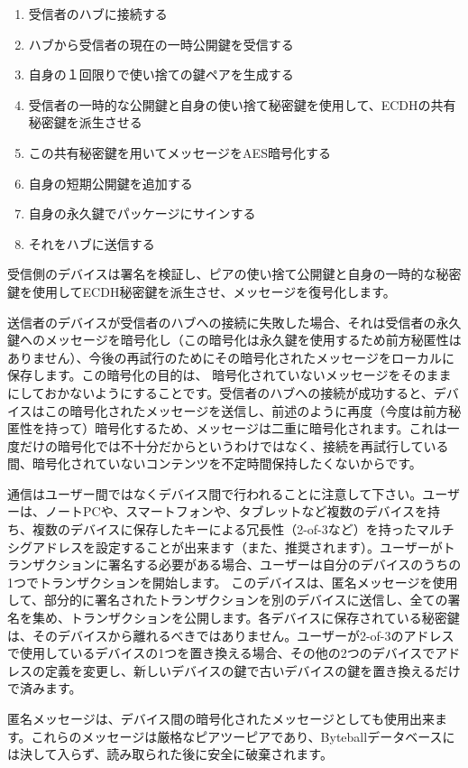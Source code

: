 \documentclass[a4paper, dvipdfmx]{jsarticle}
\begin{document}
\begin{enumerate}
    \item 受信者のハブに接続する
    \item ハブから受信者の現在の一時公開鍵を受信する
    \item 自身の１回限りで使い捨ての鍵ペアを生成する
    \item 受信者の一時的な公開鍵と自身の使い捨て秘密鍵を使用して、ECDHの共有秘密鍵を派生させる
    \item この共有秘密鍵を用いてメッセージをAES暗号化する
    \item 自身の短期公開鍵を追加する
    \item 自身の永久鍵でパッケージにサインする
    \item それをハブに送信する
\end{enumerate}

受信側のデバイスは署名を検証し、ピアの使い捨て公開鍵と自身の一時的な秘密鍵を使用してECDH秘密鍵を派生させ、メッセージを復号化します。

送信者のデバイスが受信者のハブへの接続に失敗した場合、それは受信者の永久鍵へのメッセージを暗号化し（この暗号化は永久鍵を使用するため前方秘匿性はありません）、今後の再試行のためにその暗号化されたメッセージをローカルに保存します。この暗号化の目的は、 暗号化されていないメッセージをそのままにしておかないようにすることです。受信者のハブへの接続が成功すると、デバイスはこの暗号化されたメッセージを送信し、前述のように再度（今度は前方秘匿性を持って）暗号化するため、メッセージは二重に暗号化されます。これは一度だけの暗号化では不十分だからというわけではなく、接続を再試行している間、暗号化されていないコンテンツを不定時間保持したくないからです。

通信はユーザー間ではなくデバイス間で行われることに注意して下さい。ユーザーは、ノートPCや、スマートフォンや、タブレットなど複数のデバイスを持ち、複数のデバイスに保存したキーによる冗長性（2-of-3など）を持ったマルチシグアドレスを設定することが出来ます（また、推奨されます）。ユーザーがトランザクションに署名する必要がある場合、ユーザーは自分のデバイスのうちの1つでトランザクションを開始します。 このデバイスは、匿名メッセージを使用して、部分的に署名されたトランザクションを別のデバイスに送信し、全ての署名を集め、トランザクションを公開します。各デバイスに保存されている秘密鍵は、そのデバイスから離れるべきではありません。ユーザーが2-of-3のアドレスで使用しているデバイスの1つを置き換える場合、その他の2つのデバイスでアドレスの定義を変更し、新しいデバイスの鍵で古いデバイスの鍵を置き換えるだけで済みます。

匿名メッセージは、デバイス間の暗号化されたメッセージとしても使用出来ます。これらのメッセージは厳格なピアツーピアであり、Byteballデータベースには決して入らず、読み取られた後に安全に破棄されます。
\end{document}
